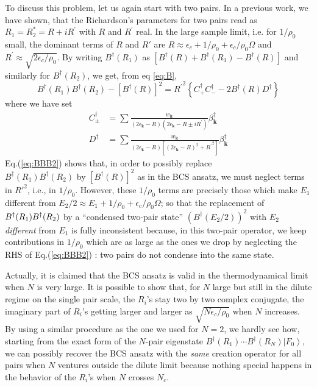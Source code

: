 \documentclass[epj]{svjour}
\newcommand{\vk}{\ensuremath{\mathbf{k}}}
\begin{document}
To discuss this problem, let us again start with two pairs. In
a previous work\cite{combescotBCS}, we have shown, that the Richardson's parameters for two pairs read as $R_1=R_{2}^{*}=R+iR^{\prime}$ with $R$
and $R^{\prime}$ real. In the
large sample limit, i.e. for $1/\rho_0$ small,  the dominant terms of $R$ and $R'$ are $R\approx\epsilon_c+1/%
\rho_0+\epsilon_c/\rho_0\Omega$ and $R^{\prime}\approx\sqrt{2\epsilon_c/\rho_0}$. By writing $B^{\dagger}(R_1)$ as $\left[B^{\dagger}(R)+B^{\dagger}(R_1)-B^{\dagger}(R)\right]$ and similarly for  $B^{\dagger}(R_2)$, 
we get, from eq \eqref{eq:B}, 
\begin{equation}\label{eq:BBB2}
B^{\dagger}(R_1)B^{\dagger}(R_2)-\left[B^{\dagger}(R)\right]
^2={R^{\prime}}^2\left\{C^{\dagger}_+C^{\dagger}_--2B^{\dagger}(R)D^{\dagger}%
\right\} 
\end{equation}
where we have set 
\begin{align}
C^{\dagger}_{\pm}&=\sum\frac{w_\vk}{\left(2\epsilon_\vk-R\right)
\left(2\epsilon_\vk-R\pm{}iR^{\prime}\right) }\beta^{\dagger}_\vk \\
D^{\dagger}&=\sum\frac{w_\vk}{\left(2\epsilon_\vk-R\right) \left[%
\left(2\epsilon_\vk-R\right) ^2+{}{R^{\prime}}^2\right] }\beta^{\dagger}_\vk
\end{align}
Eq.(\ref{eq:BBB2}) shows that, in order to possibly replace \\$B^{\dagger}(R_1)B^{\dagger}(R_2)$ by $\left[B^{\dagger}(R)\right]
^2$ as in the BCS ansatz, we must neglect terms in $R'^2$, i.e., in $1/\rho_0$. However, these $1/\rho_0$ terms are precisely those which make $E _1$ different from $E _2/2\approx E_1+1/\rho_0+\epsilon_c/\rho_0\Omega$; so that the replacement of $B^{\dagger}(R_1)B^{%
\dagger}(R_2)$ by a ``condensed two-pair state'' $\left(B^{\dagger}(E _2/2)\right) ^2$ with $E_2$ \emph{different }from $E_1$ is fully inconsistent because, in this two-pair
operator, we keep contributions in $1/\rho_0$ which are as large as the ones we drop
by neglecting the RHS of Eq.(\ref{eq:BBB2}) : two pairs do not condense into the same state.

Actually, it is claimed that the BCS ansatz is valid in the thermodynamical
limit when $N$ is very large. It is possible to show that, for $N$ large but still in the dilute regime on the single pair scale, the $R_i$'s stay two by two complex conjugate, the imaginary part of $R_i $'s getting larger and larger as $\sqrt{N\epsilon_c/\rho_0}$ when $N$ increases. By using a similar procedure as the one we used for $N=2$, we hardly see how, 
starting from the exact form of the $N$-pair eigenstate $B^{\dagger}(R_1)\cdots{}B^{\dagger}(R_N)\left|F_0\right>  $, we can possibly recover the BCS ansatz with the \emph{same} 
creation operator for all  pairs when $N$ ventures outside the dilute limit because nothing special happens in the behavior of the $R_i$'s when $N$ crosses $N_c$. 
\end{document}

